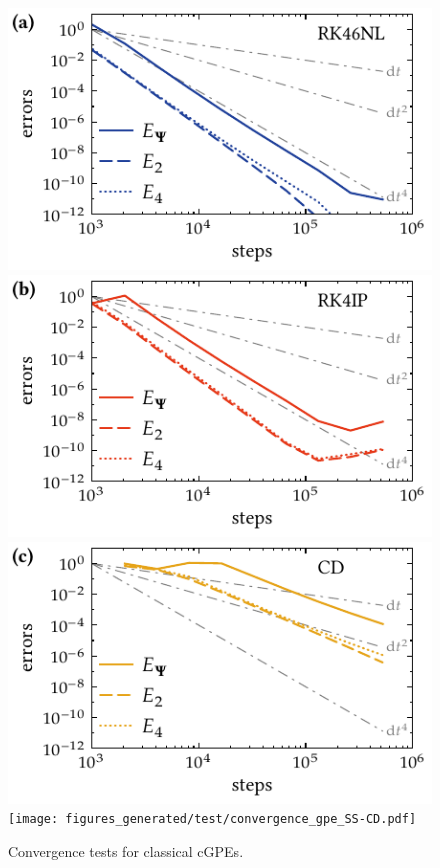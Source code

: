 \begin{figure}
    \includegraphics{figures_generated/test/convergence_gpe_RK46NL.pdf}%
    \includegraphics{figures_generated/test/convergence_gpe_RK4IP.pdf}\\%
    \includegraphics{figures_generated/test/convergence_gpe_CD.pdf}%
    \texttt{[image: figures\_generated/test/convergence\_gpe\_SS-CD.pdf]}%

    \caption[Convergence tests, cGPEs]{
    Convergence tests for classical cGPEs.}%

    \label{fig:numerical:convergence-gpe}
\end{figure}

